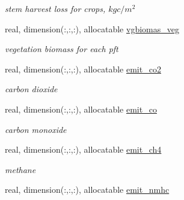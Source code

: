 \begin{DoxyCompactItemize}
\begin{DoxyCompactList}\small\item\em stem harvest loss for crops, $kg c/m^2$ \end{DoxyCompactList}\item 
\hypertarget{structctem__statevars_1_1veg__rot_aa800f4f66c1bd350f9da9e2644d97153}{}real, dimension(\+:,\+:,\+:), allocatable \hyperlink{structctem__statevars_1_1veg__rot_aa800f4f66c1bd350f9da9e2644d97153}{vgbiomas\+\_\+veg}\label{structctem__statevars_1_1veg__rot_aa800f4f66c1bd350f9da9e2644d97153}

\begin{DoxyCompactList}\small\item\em vegetation biomass for each pft \end{DoxyCompactList}\item 
\hypertarget{structctem__statevars_1_1veg__rot_af0786ff7d9fcd14b79cf6d199797c33b}{}real, dimension(\+:,\+:,\+:), allocatable \hyperlink{structctem__statevars_1_1veg__rot_af0786ff7d9fcd14b79cf6d199797c33b}{emit\+\_\+co2}\label{structctem__statevars_1_1veg__rot_af0786ff7d9fcd14b79cf6d199797c33b}

\begin{DoxyCompactList}\small\item\em carbon dioxide \end{DoxyCompactList}\item 
\hypertarget{structctem__statevars_1_1veg__rot_ac31fd6a90e0c93f0568ea04b44275317}{}real, dimension(\+:,\+:,\+:), allocatable \hyperlink{structctem__statevars_1_1veg__rot_ac31fd6a90e0c93f0568ea04b44275317}{emit\+\_\+co}\label{structctem__statevars_1_1veg__rot_ac31fd6a90e0c93f0568ea04b44275317}

\begin{DoxyCompactList}\small\item\em carbon monoxide \end{DoxyCompactList}\item 
\hypertarget{structctem__statevars_1_1veg__rot_a20a5f7579519e734df69398aa3f0debd}{}real, dimension(\+:,\+:,\+:), allocatable \hyperlink{structctem__statevars_1_1veg__rot_a20a5f7579519e734df69398aa3f0debd}{emit\+\_\+ch4}\label{structctem__statevars_1_1veg__rot_a20a5f7579519e734df69398aa3f0debd}

\begin{DoxyCompactList}\small\item\em methane \end{DoxyCompactList}\item 
\hypertarget{structctem__statevars_1_1veg__rot_abaa92a2a8f369c44ccfc9c5305da3632}{}real, dimension(\+:,\+:,\+:), allocatable \hyperlink{structctem__statevars_1_1veg__rot_abaa92a2a8f369c44ccfc9c5305da3632}{emit\+\_\+nmhc}\label{structctem__statevars_1_1veg__rot_abaa92a2a8f369c44ccfc9c5305da3632}


\end{DoxyCompactItemize}
